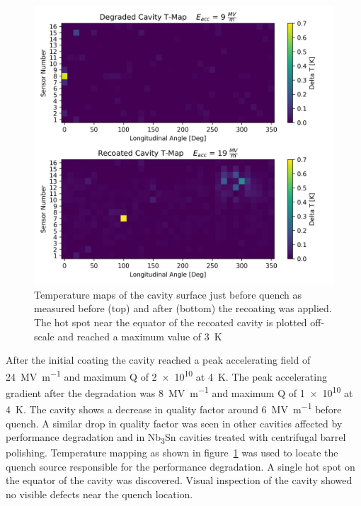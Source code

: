 \documentclass{revtex4-2}
\begin{document}
\begin{figure}[h]%
    \centering%
    \includegraphics{./figures/TMAP.png}%
    \caption{Temperature maps of the cavity surface just before quench as measured before (top) and after (bottom) the recoating was applied. The hot spot near the equator of the recoated cavity is plotted off-scale and reached a maximum value of \qty{3}{\kelvin}}%
    \label{fig:TMAP}%
\end{figure}

After the initial coating the cavity reached a peak accelerating field of \qty{24}{\mega\volt\per\meter} and maximum Q of \num{2e10} at \qty{4}{\kelvin}. The peak accelerating gradient after the degradation was \qty{8}{\mega\volt\per\meter} and maximum Q of \num{1e10} at \qty{4}{\kelvin}. The cavity shows a decrease in quality factor around \qty{6}{\mega\volt\per\meter} before quench. A similar drop in quality factor was seen in other cavities affected by performance degradation\cite{eremeev2023preservation,eremeev:srf2019-mop015} and in Nb\textsubscript{3}Sn cavities treated with centrifugal barrel polishing\cite{viklund2024improving}. Temperature mapping as shown in figure~\ref{fig:TMAP} was used to locate the quench source responsible for the performance degradation. A single hot spot on the equator of the cavity was discovered. Visual inspection of the cavity showed no visible defects near the quench location.
\end{document}
